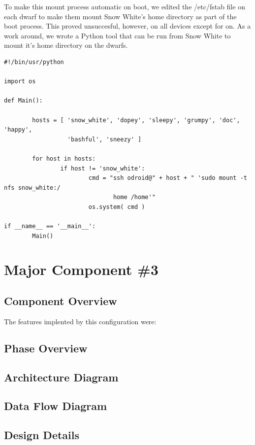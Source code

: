 To make this mount process automatic on boot, we edited the /etc/fstab file on each dwarf to make them mount Snow White's home directory as part of the boot process. This proved unsuccesful, however, on all devices except for on. As a work around, we wrote a Python tool that can be run from Snow White to mount it's home directory on the dwarfs.

\begin{lstlisting}
#!/bin/usr/python

import os

def Main():

        hosts = [ 'snow_white', 'dopey', 'sleepy', 'grumpy', 'doc', 'happy',
 				  'bashful', 'sneezy' ]

        for host in hosts:
                if host != 'snow_white':
                        cmd = "ssh odroid@" + host + " 'sudo mount -t nfs snow_white:/
							   home /home'"
                        os.system( cmd )

if __name__ == '__main__':
        Main()
\end{lstlisting}

\section{Major Component \#3 }


\subsection{Component  Overview}
The features implented by this configuration were:


\subsection{Phase Overview}

\subsection{ Architecture  Diagram}


\subsection{Data Flow Diagram}


\subsection{Design Details}

